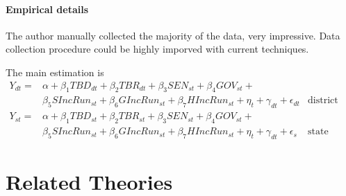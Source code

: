 \documentclass[twoside]{article}
\theoremstyle{definition}
\begin{document}
\paragraph*{Empirical details} The author manually collected the majority of the data, very impressive. Data collection procedure could be highly imporved with current techniques.

The main estimation is 
$$
\begin{aligned}
Y_{dt}= & \alpha+\beta_{1}TBD_{dt}+\beta_{2}TBR_{dt}+\beta_{3}SEN_{st}+\beta_{4}GOV_{st}+\\
& \beta_{5}SIncRun_{st}+\beta_{6}GIncRun_{st}+\beta_{7}HIncRun_{st}+\eta_{t}+\gamma_{dt}+\epsilon_{dt} & \text{district officials}\\
Y_{st}= & \alpha+\beta_{1}TBD_{st}+\beta_{2}TBR_{st}+\beta_{3}SEN_{st}+\beta_{4}GOV_{st}+\\
& \beta_{5}SIncRun_{st}+\beta_{6}GIncRun_{st}+\beta_{7}HIncRun_{st}+\eta_{t}+\gamma_{dt}+\epsilon_{s} & \text{state officials}
\end{aligned}
$$

\section{Related Theories}



\newpage


\end{document}
